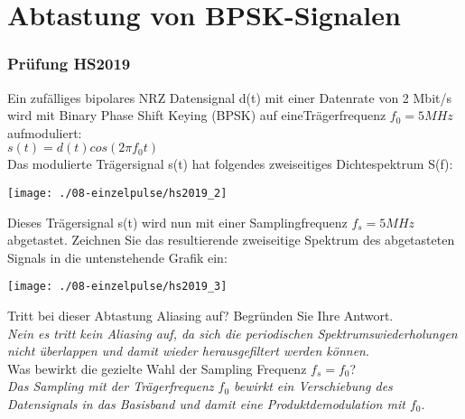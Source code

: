 

\section{Abtastung von BPSK-Signalen}

\subsubsection{Prüfung HS2019}
Ein zufälliges bipolares NRZ Datensignal d(t) mit einer Datenrate von 2 Mbit/s wird mit Binary Phase Shift Keying (BPSK) auf eineTrägerfrequenz $f_0 = 5 MHz$ aufmoduliert:\\
$s(t)=d(t)cos(2\pi f_0t)$\\

Das modulierte Trägersignal s(t) hat folgendes zweiseitiges Dichtespektrum S(f):\\
\begin{center}
    \vspace{-8pt}
    \texttt{[image: ./08-einzelpulse/hs2019\_2]}
    \vspace{-8pt}
\end{center}

Dieses Trägersignal s(t) wird nun mit einer Samplingfrequenz $f_s = 5 MHz$ abgetastet. Zeichnen Sie das resultierende zweiseitige Spektrum des abgetasteten Signals in die
untenstehende Grafik ein:
\begin{center}
    \vspace{-8pt}
    \texttt{[image: ./08-einzelpulse/hs2019\_3]}
    \vspace{-8pt}
\end{center}

Tritt bei dieser Abtastung Aliasing auf? Begründen Sie Ihre Antwort.\\
\textit{Nein es tritt kein Aliasing auf, da sich die periodischen Spektrumswiederholungen nicht überlappen und damit wieder herausgefiltert werden können}.\\

Was bewirkt die gezielte Wahl der Sampling Frequenz $f_s = f_0$?\\
\textit{Das Sampling mit der Trägerfrequenz $f_0$ bewirkt ein Verschiebung des Datensignals in das Basisband und damit eine Produktdemodulation mit $f_0$}.\\


